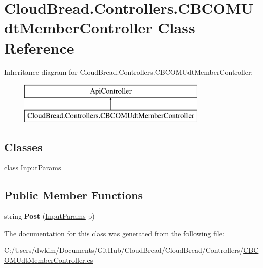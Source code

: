 \hypertarget{a00036}{}\section{Cloud\+Bread.\+Controllers.\+C\+B\+C\+O\+M\+Udt\+Member\+Controller Class Reference}
\label{a00036}
Inheritance diagram for Cloud\+Bread.\+Controllers.\+C\+B\+C\+O\+M\+Udt\+Member\+Controller\+:\begin{figure}[H]
\begin{center}
\leavevmode
\includegraphics[height=2.000000cm]{a00036}
\end{center}
\end{figure}
\subsection*{Classes}
\begin{DoxyCompactItemize}
\item 
class \hyperlink{a00097}{Input\+Params}
\end{DoxyCompactItemize}
\subsection*{Public Member Functions}
\begin{DoxyCompactItemize}
\item 
string {\bfseries Post} (\hyperlink{a00097}{Input\+Params} p)\hypertarget{a00036_a08ce03c3afd271a0554068400718fe1f}{}\label{a00036_a08ce03c3afd271a0554068400718fe1f}

\end{DoxyCompactItemize}


The documentation for this class was generated from the following file\+:\begin{DoxyCompactItemize}
\item 
C\+:/\+Users/dwkim/\+Documents/\+Git\+Hub/\+Cloud\+Bread/\+Cloud\+Bread/\+Controllers/\hyperlink{a00209}{C\+B\+C\+O\+M\+Udt\+Member\+Controller.\+cs}\end{DoxyCompactItemize}
